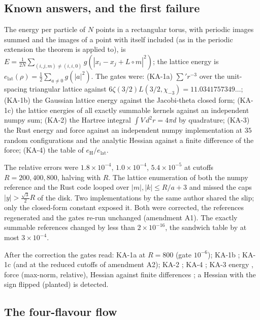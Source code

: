 \documentclass[11pt,a4paper]{article}
\newcommand{\elat}{e_{\mathrm{lat}}}
\newcommand{\eH}{e_{\mathrm{H}}}
\begin{document}
\subsection{Known answers, and the first failure}

The energy per particle of $N$ points in a rectangular torus, with periodic images summed and the images of a point with itself included
(as in the periodic extension the theorem is applied to), is $E=\frac1{2N}\sum_{(i,j,m)\ne(i,i,0)}g(|x_i-x_j+L\!\circ\! m|^2)$; the
lattice energy is $\elat(\rho)=\tfrac12\sum_{a\ne0}g(|a|^2)$. The gates were: (KA-1a) $\sum' r^{-3}$ over the unit-spacing triangular
lattice against $6\zeta(3/2)L(3/2,\chi_{-3})=11.0341757349\ldots$; (KA-1b) the Gaussian lattice energy against the Jacobi-theta closed form;
(KA-1c) the lattice energies of all exactly summable kernels against an independent numpy sum; (KA-2) the Hartree integral
$\int V\,d^2r=4\pi d$ by quadrature; (KA-3) the Rust energy and force against an independent numpy implementation at $35$ random
configurations and the analytic Hessian against a finite difference of the force; (KA-4) the table of $\eH/\elat$.

\begin{failbox}[title={KA-1a failed as registered, first}]
The relative errors were $1.8\times10^{-4}$, $1.0\times10^{-4}$, $5.4\times10^{-5}$ at cutoffs $R=200,400,800$, halving with $R$. The lattice
enumeration of both the numpy reference and the Rust code looped over $|m|,|k|\le R/a+3$ and missed the caps $|y|>\tfrac{\sqrt3}2R$ of
the disk. Two implementations by the same author shared the slip; only the closed-form constant exposed it. Both were corrected, the
references regenerated and the gates re-run unchanged (amendment A1). The exactly summable references changed by less than $2\times10^{-16}$,
the sandwich table by at most $3\times10^{-4}$.
\end{failbox}

After the correction the gates read: KA-1a \KAaRel{} at $R=800$ (gate $10^{-6}$); KA-1b \KAbRel{}; KA-1c \KAcRel{} (and \KAcAtwoRel{} at the
reduced cutoffs of amendment A2); KA-2 \KAtwoRel{}; KA-4 \KAfourRel{}; KA-3 energy \KAthreeE{}, force \KAthreeF{} (max-norm, relative),
Hessian against finite differences \KAthreeHess{}; a Hessian with the sign flipped (planted) is detected.

\subsection{The four-flavour flow}
\end{document}
